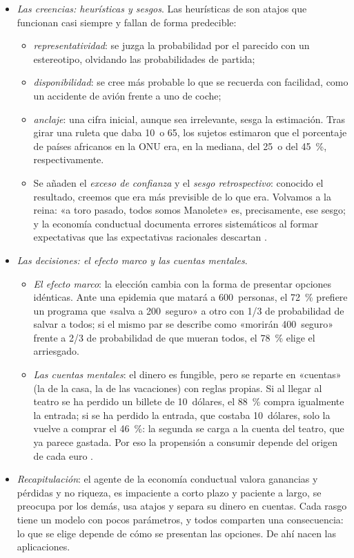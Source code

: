 \documentclass[11pt]{article}
\begin{document}
\begin{itemize}
\item \emph{Las creencias: heurísticas y sesgos}. Las heurísticas de \textcite{TverskyKahneman1974Judgment} son atajos que funcionan casi siempre y fallan de forma predecible:
  \begin{itemize}
  \item \emph{representatividad}: se juzga la probabilidad por el parecido con un estereotipo, olvidando las probabilidades de partida;
  \item \emph{disponibilidad}: se cree más probable lo que se recuerda con facilidad, como un accidente de avión frente a uno de coche;
  \item \emph{anclaje}: una cifra inicial, aunque sea irrelevante, sesga la estimación. Tras girar una ruleta que daba 10~o 65, los sujetos estimaron que el porcentaje de países africanos en la ONU era, en la mediana, del 25~o del 45~\%, respectivamente.
  \end{itemize}
  \begin{itemize}
  \item Se añaden el \emph{exceso de confianza} y el \emph{sesgo retrospectivo}: conocido el resultado, creemos que era más previsible de lo que era\nocite{Fischhoff1975Hindsight}. Volvamos a la reina: «a toro pasado, todos somos Manolete» es, precisamente, ese sesgo; y la economía conductual documenta errores sistemáticos al formar expectativas que las expectativas racionales descartan .
  \end{itemize}
\item \emph{Las decisiones: el efecto marco y las cuentas mentales}.
  \begin{itemize}
  \item \emph{El efecto marco}: la elección cambia con la forma de presentar opciones idénticas. Ante una epidemia que matará a 600~personas, el 72~\% prefiere un programa que «salva a 200~seguro» a otro con 1/3 de probabilidad de salvar a todos; si el mismo par se describe como «morirán 400~seguro» frente a 2/3 de probabilidad de que mueran todos, el 78~\% elige el arriesgado\nocite{TverskyKahneman1981Framing}.
  \item \emph{Las cuentas mentales}: el dinero es fungible, pero se reparte en «cuentas» (la de la casa, la de las vacaciones) con reglas propias\nocite{Thaler1985Mental,Thaler1999Mental}. Si al llegar al teatro se ha perdido un billete de 10~dólares, el 88~\% compra igualmente la entrada; si se ha perdido la entrada, que costaba 10~dólares, solo la vuelve a comprar el 46~\%: la segunda se carga a la cuenta del teatro, que ya parece gastada\nocite{TverskyKahneman1981Framing}. Por eso la propensión a consumir depende del origen de cada euro\nocite{ShefrinThaler1988} .
  \end{itemize}
\item \emph{Recapitulación}: el agente de la economía conductual valora ganancias y pérdidas y no riqueza, es impaciente a corto plazo y paciente a largo, se preocupa por los demás, usa atajos y separa su dinero en cuentas. Cada rasgo tiene un modelo con pocos parámetros, y todos comparten una consecuencia: lo que se elige depende de cómo se presentan las opciones. De ahí nacen las aplicaciones.
\end{itemize}
\end{document}
